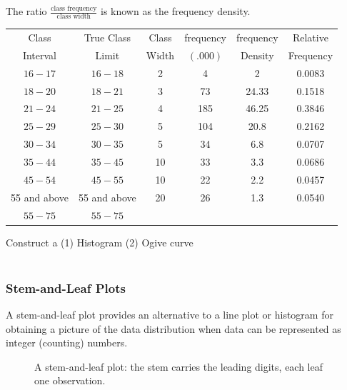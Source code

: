 \documentclass[11pt,a4paper]{article}
\theoremstyle{definition}
\begin{document}
The ratio $\frac{\text{class frequency}}{\text{class width}}$ is known as the frequency density.\\[1ex]

\begin{table}[H]
\centering
\begin{tabular}{|c|c|c|c|c|c|}
\hline Class & True Class & Class & frequency & frequency & Relative\\
Interval & Limit & Width & $(.000)$ & Density & Frequency\\
\hline $16-17$ & $16-18$ & 2& 4&2 & 0.0083\\
$18-20$ & $18-21$ &3 &73&24.33&0.1518\\
$21-24$ & $21-25$ & 4 & 185& 46.25&0.3846\\
$25-29$&$25-30$&5&104&20.8&0.2162\\
$30-34$&$30-35$&5&34&6.8&0.0707\\
$35-44$&$35-45$&10&33&3.3&0.0686\\
$45-54$&$45-55$&10&22&2.2&0.0457\\
55 and above & 55 and above &20&26&1.3&0.0540\\
$55-75$&$55-75$&&&&\\
\hline
\end{tabular}
\end{table}

Construct a (1) Histogram (2) Ogive curve\\[1ex]\\









\subsubsection{Stem-and-Leaf Plots}
A stem-and-leaf plot provides an alternative to a line plot or histogram for obtaining a picture of the data distribution when data can be represented as integer (counting) numbers.

\begin{figure}[H]
\centering
{}
\caption{A stem-and-leaf plot: the stem carries the leading digits, each leaf one observation.}
\end{figure}
\end{document}
